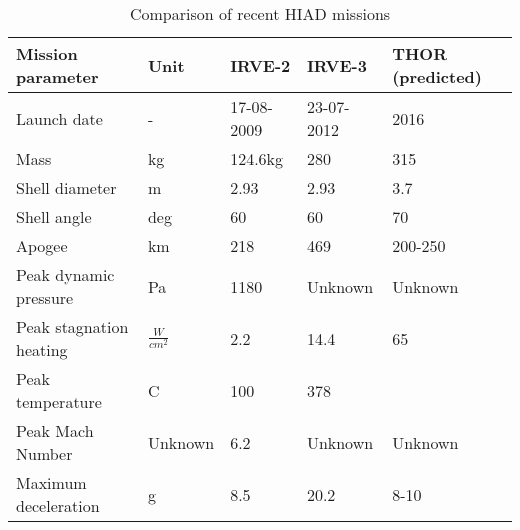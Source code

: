 \begin{table}[ht!]
\vspace{-20mm}
	\caption{Comparison of recent HIAD missions}%
		\begin{tabular}{|p{}|p{}|p{}|p{}|p{}|} %
			\hline

       Mission parameter   &       Unit &     IRVE-2 \cite{irve2} &     IRVE-3 \citep{irve3,thor} & THOR (predicted) \citep{thor} \\
			\hline

Launch date &          - & 17-08-2009 & 23-07-2012 &       2016 \\
			\hline

      Mass &         kg &    124.6kg &        280 &        315 \\
			\hline

Shell diameter &          m &       2.93 &       2.93 &        3.7 \\
			\hline

Shell angle &     deg &         60 &         60 &         70 \\
			\hline

    Apogee &         km &        218 &        469 &    200-250 \\
			\hline

Peak dynamic pressure &         Pa &       1180 &   Unknown         &   Unknown         \\
			\hline

Peak stagnation heating &     $ \frac{W}{cm^{2}}$ &        2.2 &       14.4 &         65 \\
			\hline

Peak temperature &          C &        100 &        378 &            \\
			\hline

Peak Mach Number &          Unknown &        6.2 &  Unknown          &   Unknown         \\
			\hline

Maximum deceleration &          g &        8.5 &       20.2 &       8-10 \\
			\hline

		\end{tabular}
    \label{tab:hiadcomparison}%
\end{table}


